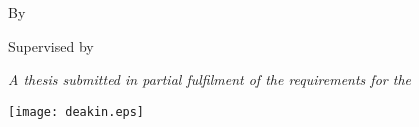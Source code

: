 \vspace*{\fill}
\thispagestyle{empty}
\linespread{1.2}

\centering

\LARGE
\textbf{\thetitle}
\vspace{1 cm}

\Large
By \theauthor{}
\\
\vspace{-0.25 cm}
{\normalsize \theauthorspostnominals{}}
\vspace{0.75 cm}

\large
Supervised by \thesupervisor

\vspace{1 cm}

\itshape
A thesis submitted in partial fulfilment of the requirements for the\\
\upshape
\thedegree

\vspace{1.5 cm}
\texttt{[image: deakin.eps]}
\vspace{1.5 cm}

\upshape
\theinstitution

\vspace{1cm}
\thedate
\vspace*{\fill}

\justify
\normalsize
\restoregeometry